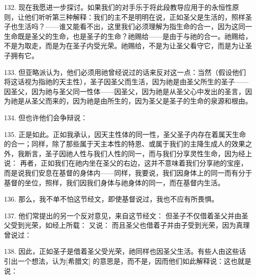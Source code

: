 132. 现在我愿进一步探讨。如果我们的对手乐于将此段教导应用于的永恒性原则，让他们听听第三种解释：我们的主不是明明在说，正如圣父是生活的，照样圣子也生活吗？——谁又能看不出，这里我们必须理解为指生命的合一，因为这同一生命既是圣父的生命，也是圣子的生命？祂赐给——是由于与祂的合一。祂赐给，不是为取走，而是为在圣子内受光荣。祂赐给，不是为让圣父看守它，而是为让圣子拥有它。\par

133. 但亚略派认为，他们必须用祂曾经说过的话来反对这一点：当然（假设他们将这话视为指祂的天主性），圣子因圣父而生活，因为祂是由圣父所生的圣子——因圣父，因为祂与圣父同一性体——因圣父，因为祂是从圣父心中发出的圣言，因为祂是从圣父而来的，因为祂是由所生的，因为圣父是圣子的生命的泉源和根由。\par

134. 但也许他们会争辩说：\par

135. 正是如此。正如我承认，因天主性体的同一性，圣父圣子内存在着属天生命的合一；同样，除了那些属于天主本性的特恩、或属于我们的主降生成人的效果之外，我断言，圣子因祂人性与我们人性的同一，而与我们分享灵性生命，因为经上说： 再者，正如我们在祂内坐在圣父的右边，这并不意味着我们分享祂的宝座，而是说我们安息在基督的身体内——同样，我要说，我们因身体上的同一而有分于基督的坐位，照样，我们因我们身体与祂身体的同一，而在基督内生活。\par

136. 那么，我不单不怕这节经文，即使基督说过，我也不应有所畏惧。\par

137. 他们常提出的另一个反对意见，来自这节经文：  但圣子不仅借着圣父并由圣父受到光荣，如经上所载：  又说：  而且圣父也借着子并由子受到光荣，因为真理曾说过： \par

138. 因此，正如圣子是借着圣父受光荣，祂同样也因圣父生活。有些人由这些话引出一个想法，认为[希腊文]  的意思是，而不是，因而他们如此解释说：这也就是说：\par

